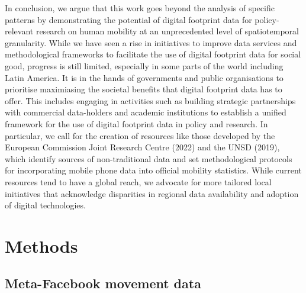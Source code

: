 \documentclass[
  11pt,
]{article}
\begin{document}
In conclusion, we argue that this work goes beyond the analysis of
specific patterns by demonstrating the potential of digital footprint
data for policy-relevant research on human mobility at an unprecedented
level of spatiotemporal granularity. While we have seen a rise in
initiatives to improve data services and methodological frameworks to
facilitate the use of digital footprint data for social good, progress
is still limited, especially in some parts of the world including Latin
America. It is in the hands of governments and public organisations to
prioritise maximiasing the societal benefits that digital footprint data
has to offer. This includes engaging in activities such as building
strategic partnerships with commercial data-holders and academic
institutions to establish a unified framework for the use of digital
footprint data in policy and research. In particular, we call for the
creation of resources like those developed by the European Commission
Joint Research Centre (2022) and the UNSD (2019), which identify sources
of non-traditional data and set methodological protocols for
incorporating mobile phone data into official mobility statistics. While
current resources tend to have a global reach, we advocate for more
tailored local initiatives that acknowledge disparities in regional data
availability and adoption of digital technologies.

\hypertarget{sec-methods}{%
\section{Methods}\label{sec-methods}}

\hypertarget{meta-facebook-movement-data}{%
\subsection{Meta-Facebook movement
data}\label{meta-facebook-movement-data}}
\end{document}
